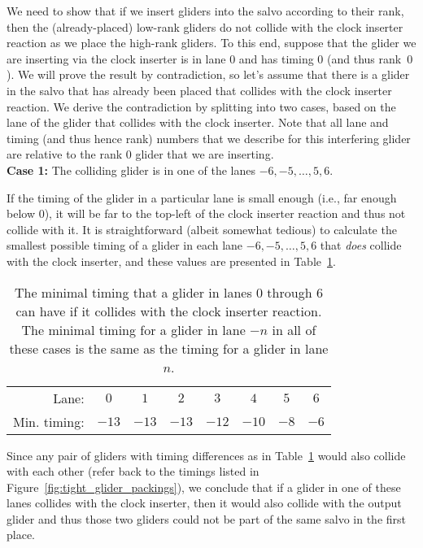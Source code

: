 We need to show that if we insert gliders into the salvo according to their rank, then the (already-placed) low-rank gliders do not collide with the clock inserter reaction as we place the high-rank gliders. To this end, suppose that the glider we are inserting via the clock inserter is in lane $0$ and has timing $0$ (and thus rank~$0$). We will prove the result by contradiction, so let's assume that there is a glider in the salvo that has already been placed that collides with the clock inserter reaction. We derive the contradiction by splitting into two cases, based on the lane of the glider that collides with the clock inserter. Note that all lane and timing (and thus hence rank) numbers that we describe for this interfering glider are relative to the rank $0$ glider that we are inserting. \\

\noindent \textbf{Case 1:} The colliding glider is in one of the lanes $-6, -5, \ldots, 5, 6$.

If the timing of the glider in a particular lane is small enough (i.e., far enough below $0$), it will be far to the top-left of the clock inserter reaction and thus not collide with it. It is straightforward (albeit somewhat tedious) to calculate the smallest possible timing of a glider in each lane $-6, -5, \ldots, 5, 6$ that \emph{does} collide with the clock inserter, and these values are presented in Table~\ref{tab:clock_inserter_ranks}.

\begin{table}[!htb]\vspace*{0.05in}
	\begin{center}		
		\begin{tabular}{r c c c c c c c}
			\toprule
			Lane: & $0$ & $1$ & $2$ & $3$ & $4$ & $5$ & $6$ \\
			\rowcolor{gray!20} Min. timing: & $-13$ & $-13$ & $-13$ & $-12$ & $-10$ & $-8$ & $-6$ \\\bottomrule
		\end{tabular}
		\caption{The minimal timing that a glider in lanes $0$ through $6$ can have if it collides with the clock inserter reaction. The minimal timing for a glider in lane $-n$ in all of these cases is the same as the timing for a glider in lane $n$.}\label{tab:clock_inserter_ranks}
	\end{center}
\end{table}

Since any pair of gliders with timing differences as in Table~\ref{tab:clock_inserter_ranks} would also collide with each other (refer back to the timings listed in Figure~\ref{fig:tight_glider_packings}), we conclude that if a glider in one of these lanes collides with the clock inserter, then it would also collide with the output glider and thus those two gliders could not be part of the same salvo in the first place. \\

